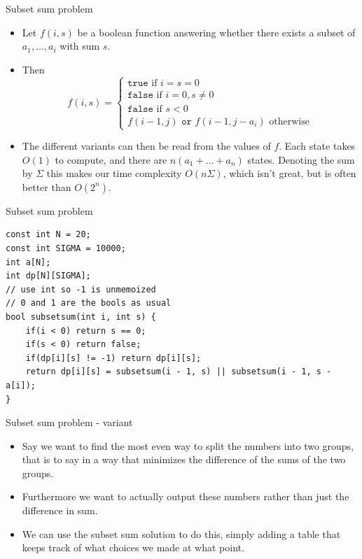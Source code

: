 \documentclass{beamer}
\begin{document}
\begin{frame}[plain]{Subset sum problem}
    \vspace{10pt}

    \begin{itemize}
        \item Let $f(i, s)$ be a boolean function answering whether there exists a subset of $a_1, \dots, a_i$ with sum $s$.
        
        \item Then      
        \[f(i, s) = \begin{cases}\texttt{true} \text{ if } i = s = 0 \\ \texttt{false} \text{ if } i = 0, s \neq 0 \\ \texttt{false} \text{ if } s < 0 \\ f(i - 1, j) \texttt{ or } f(i - 1, j - a_i) \text{ otherwise} \end{cases}\]
        
        \item The different variants can then be read from the values of $f$. Each state takes $O(1)$ to compute, and there are $n(a_1 + \dots + a_n)$ states. Denoting the sum by $\Sigma$ this makes our time complexity $O(n\Sigma)$, which isn't great, but is often better than $O(2^n)$.
    \end{itemize}
\end{frame}

\begin{frame}{Subset sum problem}
    \begin{verbatim}
const int N = 20;
const int SIGMA = 10000;
int a[N];
int dp[N][SIGMA]; 
// use int so -1 is unmemoized
// 0 and 1 are the bools as usual
bool subsetsum(int i, int s) {
    if(i < 0) return s == 0;
    if(s < 0) return false;
    if(dp[i][s] != -1) return dp[i][s];
    return dp[i][s] = subsetsum(i - 1, s) || subsetsum(i - 1, s - a[i]);
}
    \end{verbatim}
\end{frame}

\begin{frame}[plain]{Subset sum problem - variant}
    \vspace{10pt}

    \begin{itemize}
        \item Say we want to find the most even way to split the numbers into two groups, that is to say in a way that minimizes the difference of the sums of the two groups.
        
        \item Furthermore we want to actually output these numbers rather than just the difference in sum.
        
        \item We can use the subset sum solution to do this, simply adding a table that keeps track of what choices we made at what point.
    \end{itemize}
\end{frame}
\end{document}
